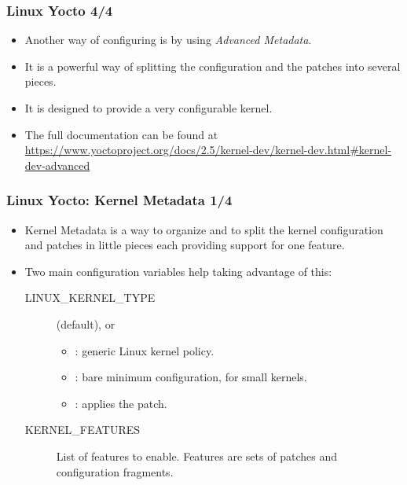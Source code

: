 \begin{frame}
  \frametitle{Linux Yocto 4/4}
  \begin{itemize}
    \item Another way of configuring  is by using
      \emph{Advanced Metadata}.
    \item It is a powerful way of splitting the configuration and the
      patches into several pieces.
    \item It is designed to provide a very configurable kernel.
    \item The full documentation can be found at
      \url{https://www.yoctoproject.org/docs/2.5/kernel-dev/kernel-dev.html\#kernel-dev-advanced}
  \end{itemize}
\end{frame}

\begin{frame}
  \frametitle{Linux Yocto: Kernel Metadata 1/4}
  \begin{itemize}
    \item Kernel Metadata is a way to organize and to split the
      kernel configuration and patches in little pieces each providing
      support for one feature.
    \item Two main configuration variables help taking advantage of
      this:
      \begin{description}
        \item[LINUX\_KERNEL\_TYPE]  (default),
           or 
          \begin{itemize}
            \item {}: generic Linux kernel policy.
            \item {}: bare minimum configuration, for small
              kernels.
            \item {}: applies the 
              patch.
          \end{itemize}
        \item[KERNEL\_FEATURES] List of features to enable. Features
          are sets of patches and configuration fragments.
      \end{description}
  \end{itemize}
\end{frame}

